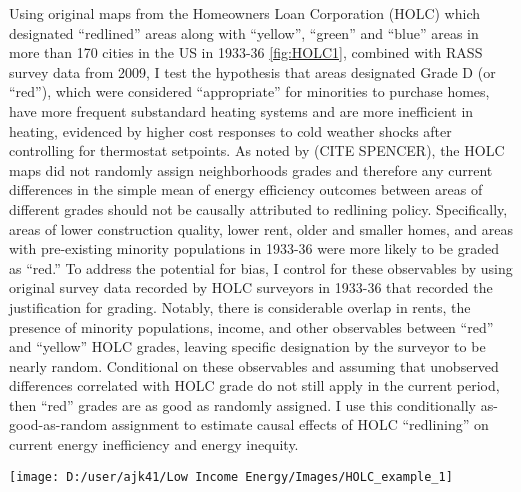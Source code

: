 \documentclass[
]{article}
\begin{document}
Using original maps from the Homeowners Loan Corporation (HOLC) which
designated ``redlined'' areas along with ``yellow'', ``green'' and
``blue'' areas in more than 170 cities in the US in 1933-36
\ref{fig:HOLC1}, combined with RASS survey data from 2009, I test the
hypothesis that areas designated Grade D (or ``red''), which were
considered ``appropriate'' for minorities to purchase homes, have more
frequent substandard heating systems and are more inefficient in
heating, evidenced by higher cost responses to cold weather shocks after
controlling for thermostat setpoints. As noted by (CITE SPENCER), the
HOLC maps did not randomly assign neighborhoods grades and therefore any
current differences in the simple mean of energy efficiency outcomes
between areas of different grades should not be causally attributed to
redlining policy. Specifically, areas of lower construction quality,
lower rent, older and smaller homes, and areas with pre-existing
minority populations in 1933-36 were more likely to be graded as
``red.'' To address the potential for bias, I control for these
observables by using original survey data recorded by HOLC surveyors in
1933-36 that recorded the justification for grading. Notably, there is
considerable overlap in rents, the presence of minority populations,
income, and other observables between ``red'' and ``yellow'' HOLC
grades, leaving specific designation by the surveyor to be nearly
random. Conditional on these observables and assuming that unobserved
differences correlated with HOLC grade do not still apply in the current
period, then ``red'' grades are as good as randomly assigned. I use this
conditionally as-good-as-random assignment to estimate causal effects of
HOLC ``redlining'' on current energy inefficiency and energy inequity.

\begin{center}\texttt{[image: D:/user/ajk41/Low Income Energy/Images/HOLC\_example\_1]} \end{center}
\end{document}
